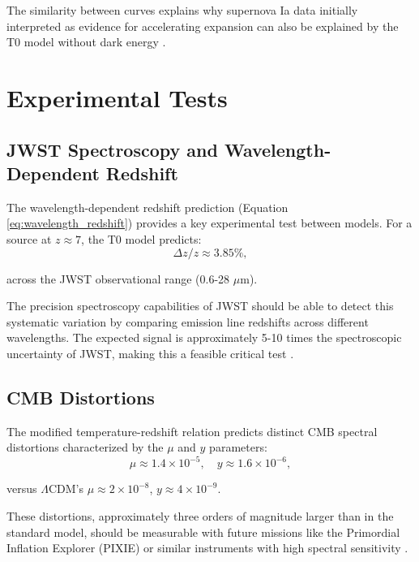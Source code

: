 \documentclass[12pt,a4paper]{article}
\newcommand{\LCDM}{\Lambda\text{CDM}}
\begin{document}
	The similarity between curves explains why supernova Ia data initially interpreted as evidence for accelerating expansion can also be explained by the T0 model without dark energy \cite{pascher_galaxies_2025}.
	
	\section{Experimental Tests}
	\label{sec:tests}
	
	\subsection{JWST Spectroscopy and Wavelength-Dependent Redshift}
	\label{subsec:jwst_test}
	
	The wavelength-dependent redshift prediction (Equation \ref{eq:wavelength_redshift}) provides a key experimental test between models. For a source at \(z \approx 7\), the T0 model predicts:
	\begin{equation}
		\Delta z / z \approx 3.85\%,
		\label{eq:redshift_variation_high_z}
	\end{equation}
	
	across the JWST observational range (0.6-28 \(\mu\text{m}\)).
	
	The precision spectroscopy capabilities of JWST should be able to detect this systematic variation by comparing emission line redshifts across different wavelengths. The expected signal is approximately 5-10 times the spectroscopic uncertainty of JWST, making this a feasible critical test \cite{pascher_params_2025}.
	
	\subsection{CMB Distortions}
	\label{subsec:cmb_distortions_test}
	
	The modified temperature-redshift relation predicts distinct CMB spectral distortions characterized by the \(\mu\) and \(y\) parameters:
	\begin{equation}
		\mu \approx 1.4 \times 10^{-5}, \quad y \approx 1.6 \times 10^{-6},
		\label{eq:distortion_parameters}
	\end{equation}
	
	versus \(\LCDM\)'s \(\mu \approx 2 \times 10^{-8}\), \(y \approx 4 \times 10^{-9}\).
	
	These distortions, approximately three orders of magnitude larger than in the standard model, should be measurable with future missions like the Primordial Inflation Explorer (PIXIE) or similar instruments with high spectral sensitivity \cite{pascher_temp_2025}.
	
\end{document}
